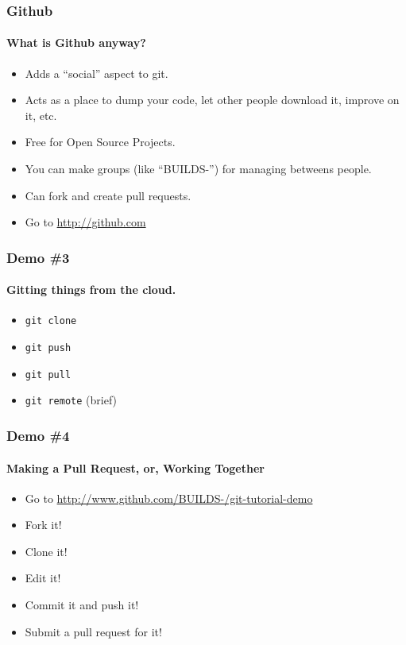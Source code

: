 \documentclass{beamer}
\begin{document}
  \begin{frame}
    \frametitle{Github}
    \framesubtitle{What is Github anyway?}

    \begin{itemize}
  		\item Adds a ``social'' aspect to git.
  		\item Acts as a place to dump your code, let other people download it, improve on it, etc.
  		\item Free for Open Source Projects.
  		\item You can make groups (like ``BUILDS-'') for managing betweens people.
  		\item Can fork and create pull requests.
	    \item Go to \url{http://github.com}
    \end{itemize}
  \end{frame}

  \begin{frame}
    \frametitle{Demo \#3}
    \framesubtitle{Gitting things from the cloud.}

    \begin{itemize}
	    \item \texttt{git clone}
	    \item \texttt{git push}
	    \item \texttt{git pull}
	    \item \texttt{git remote} (brief)
    \end{itemize}
  \end{frame}

  \begin{frame}
    \frametitle{Demo \#4}
    \framesubtitle{Making a Pull Request, or, Working Together}

    \begin{itemize}
	    \item Go to \url{http://www.github.com/BUILDS-/git-tutorial-demo}

	    \item Fork it!
	    \item Clone it!
	    \item Edit it!
	    \item Commit it and push it!
	    \item Submit a pull request for it!
    \end{itemize}
  \end{frame}
\end{document}
